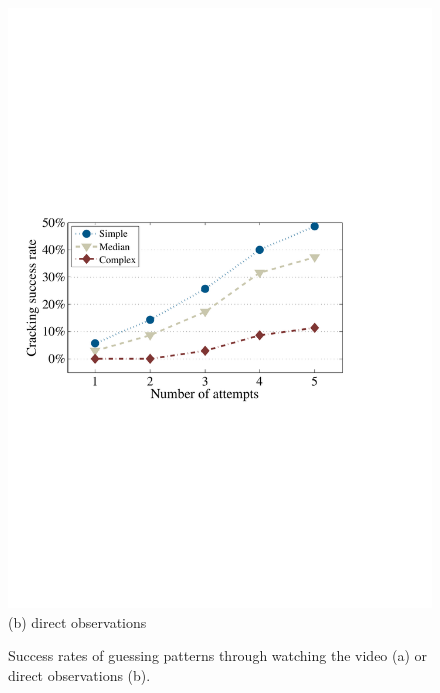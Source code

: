 \begin{figure}[!t]
{\begin{minipage}[t]{0.5\textwidth}
                \includegraphics[width=\textwidth]{fig/look-finger.pdf}\\
                \centering \footnotesize (b) direct observations
                \end{minipage}
            }
            \vspace{-2mm}
            \caption{Success rates of guessing patterns through watching the video (a) or direct observations (b).}
            \label{fig:look-unlocking process}
        \end{figure}

